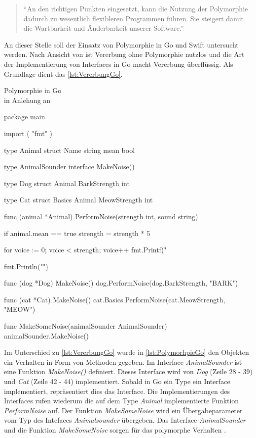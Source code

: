 \begin{quote}
\enquote{An den richtigen Punkten eingesetzt, kann die Nutzung der Polymorphie dadurch zu wesentlich flexibleren Programmen führen. Sie steigert damit die Wartbarkeit und Änderbarkeit unserer Software.}
\cite[]{Lahres.2011}
\end{quote}

An dieser Stelle soll der Einsatz von Polymorphie in Go und Swift untersucht werden. 
Nach Ansicht von \cite[]{WilliamKennedy.2013} ist Vererbung ohne Polymorphie nutzlos und die Art der Implementierung von Interfaces in Go macht Vererbung überflüssig. 
Als Grundlage dient das \autoref{lst:VererbungGo}. 

\begin{listing}[H]
\caption{Polymorphie in Go \\ in Anlehung an \cite[]{WilliamKennedy.2013}}
\label{lst:PolymorhpieGo}
\begin{GoCode}
package main

import (
    "fmt"
)

type Animal struct {
    Name string
    mean bool
}

type AnimalSounder interface {
    MakeNoise()
}

type Dog struct {
    Animal
    BarkStrength int
}

type Cat struct {
    Basics Animal
    MeowStrength int
}

func (animal *Animal) PerformNoise(strength int, sound string) {
    if animal.mean == true {
        strength = strength * 5
    }

    for voice := 0; voice < strength; voice++ {
        fmt.Printf("%
    }

    fmt.Println("")
}

func (dog *Dog) MakeNoise() {
    dog.PerformNoise(dog.BarkStrength, "BARK")
}

func (cat *Cat) MakeNoise() {
    cat.Basics.PerformNoise(cat.MeowStrength, "MEOW")
}

func MakeSomeNoise(animalSounder AnimalSounder) {
    animalSounder.MakeNoise()
}
\end{GoCode}
\end{listing}

Im Unterschied zu \autoref{lst:VererbungGo} wurde in \autoref{lst:PolymorhpieGo} den Objekten ein Verhalten in Form von Methoden gegeben.
Im Interface \emph{AnimalSounder} ist eine Funktion \emph{MakeNoise()} definiert. 
Dieses Interface wird von \emph{Dog} (Zeile 28 - 39) und \emph{Cat} (Zeile 42 - 44) implementiert. 
Sobald in Go ein Type ein Interface implementiert, repräsentiert dies das Interface. 
Die Implementierungen des Interfaces rufen wiederum die auf dem Type \emph{Animal} implementierte Funktion \emph{PerformNoise} auf.
Der Funktion \emph{MakeSomeNoise} wird ein Übergabeparameter vom Typ des Intefaces \emph{Animalsounder} übergeben. 
Das Interface \emph{AnimalSounder} und die Funktion \emph{MakeSomeNoise} sorgen für das polymorphe Verhalten \cite[]{WilliamKennedy.2013}.  

